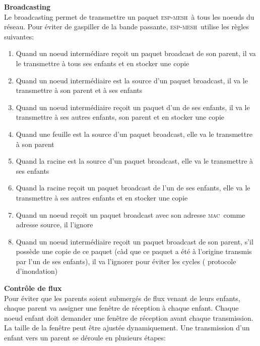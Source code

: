 \documentclass[a4paper, 12pt]{report}
\newcommand{\espmesh}{\textsc{esp-mesh}}
\newcommand{\mac}{\textsc{mac}}
\begin{document}
        \vspace{0.5cm}
        \textbf{Broadcasting}\\
            Le broadcasting permet de transmettre un paquet \espmesh\ à tous les noeuds du réseau. Pour éviter de gaspiller de
            la bande passante, \espmesh\ utilise les règles suivantes:
            \begin{enumerate}
                \item Quand un noeud intermédiare reçoit un paquet broadcast de son parent, il va le transmettre à tous ses enfants
                    et en stocker une copie
                \item Quand un noeud intermédiaire est la source d'un paquet broadcast, il va le transmettre à son parent et à ses enfants
                \item Quand un noeud intermédiaire reçoit un paquet d'un de ses enfants, il va le transmettre à ses autres enfants, son parent
                    et en stocker une copie
                \item Quand une feuille est la source d'un paquet broadcast, elle va le transmettre à son parent
                \item Quand la racine est la source d'un paquet broadcast, elle va le transmettre à ses enfants
                \item Quand la racine reçoit un paquet broadcast de l'un de ses enfants, elle va le transmettre à ses autres enfants et en stocker une copie
                \item Quand un noeud reçoit un paquet broadcast avec son adresse \mac\ comme adresse source, il l'ignore
                \item Quand un noeud intermédiaire reçoit un paquet broadcast de son parent, s'il possède une copie de ce paquet (càd que ce paquet a été à l'origine transmis par l'un de ses enfants), il va l'ignorer
                    pour éviter les cycles ( protocole d'inondation)
            \end{enumerate}
        \vspace{0.5cm}
        \textbf{Contrôle de flux}\\%
            Pour éviter que les parents soient submergés de flux venant de leurs enfants, chaque parent va
            assigner une fenêtre de réception à chaque enfant. Chaque noeud enfant doit demander une fenêtre
            de réception avant chaque transmission. La taille de la fenêtre peut être ajustée dynamiquement.
            Une transmission d'un enfant vers un parent se déroule en plusieurs étapes:
\end{document}
